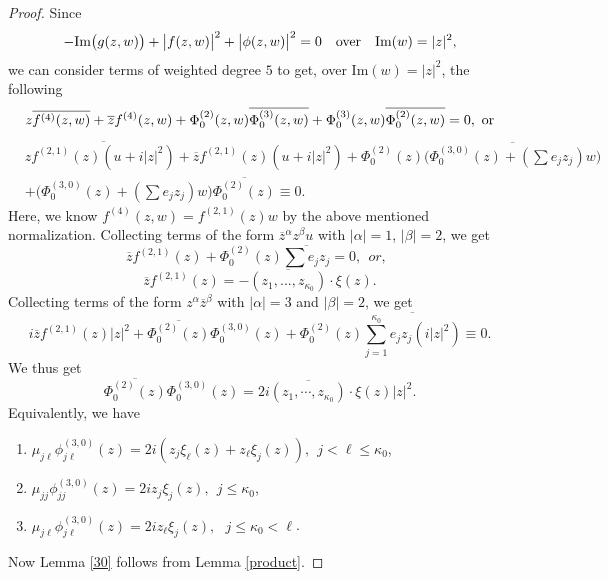 \documentclass[12pt]{article}
\numberwithin{equation}{section}
\def\ov{\overline}
\begin{document}
\begin{proof} Since
\begin{equation}
\label{*}
-\text{Im}\big(g(z,w)\big)+\big|f(z,w)\big|^2+\big|\phi(z,w)\big|^2=0\
\ \ \hbox{over}\ \ \ \text{Im}(w)=|z|^2,
\end{equation}
we can consider terms of weighted degree $5$ to get,  over
Im$(w)=|z|^2$, the following
\begin{equation*}
z \ov{f^{(4)}(z,w)}+ \ov z f^{(4)}(z,w) + \Phi^{(2)}_0(z,w)
\ov{\Phi^{(3)}_0(z,w)} + \Phi^{(3)}_0(z,w)
\ov{\Phi^{(2)}_0(z,w)}=0,\  \hbox{or}
\end{equation*}
\begin{equation}\begin{split}
&z \ov{f^{(2,1)}(z)(u+i|z|^2)} + \ov z f^{(2,1)}(z)(u+i |z|^2) +
\Phi^{(2)}_0(z) \ov{\bigg(\Phi^{(3,0)}_0(z)+(\sum e_j z_j)w\bigg)}\\
&+ \bigg( \Phi^{(3,0)}_0(z)+(\sum e_j z_j) w\bigg)
\ov{\Phi^{(2)}_0(z)}\equiv 0.
\end{split}\end{equation}
Here, we know $f^{(4)}(z,w)=f^{(2,1)}(z)w$ by the above mentioned
normalization. Collecting terms of the form $\ov z^\alpha z^\beta u$
with $|\alpha|=1$, $|\beta|=2$, we get
\[
\ov z f^{(2,1)}(z) + \Phi^{(2)}_0(z) \ov{\sum e_j z_j} = 0, \ \ or,
\ \
\]
\begin{equation}\label{hh}
\ov z f^{(2,1)}(z) = - \ov{\text{{$(z_1, ..., z_{\kappa_0})$}}}\cdot
\xi(z).
\end{equation}
Collecting terms of the form $z^\alpha \ov z^\beta$ with
$|\alpha|=3$ and $|\beta|=2$, we get
\begin{equation}
i \ov z f^{(2,1)}(z) |z|^2 +\ov{\Phi^{(2)}_0(z)}{ \Phi^{(3,0)}_0(z)}
+ {\Phi^{(2)}_0(z)} \ov{\sum^{\kappa_0}_{j=1} e_j z_j  (i |z|^2)}
\equiv 0.
\end{equation}
We thus get
\begin{equation}
\label{(3)'} \ov{\Phi^{(2)}_0 (z)}{ \Phi^{(3,0)}_0(z)}=2 i \ov
{(z_1,\cdots,z_{\kappa_0})}\cdot \xi(z) |z|^2.
\end{equation}
Equivalently,  we have
\begin{enumerate}
\item $\mu_{j \ell} \phi^{(3, 0)}_{j \ell}(z) = 2i (z_j \xi_\ell(z) + z_\ell
\xi_j(z)),\ \ j<\ell \le \kappa_0$,
\item  $\mu_{j j } \phi^{(3, 0)}_{j j}(z) = 2i z_j  \xi_j (z),\ \ j\le
\kappa_0$,
\item $\mu_{j \ell} \phi^{(3, 0)}_{j \ell}(z) = 2i z_\ell \xi_j(z),\ \ \ j\le
\kappa_0 < \ell$.
\end{enumerate}
Now Lemma \ref{30} follows from Lemma \ref{product}.\end{proof}
\end{document}
